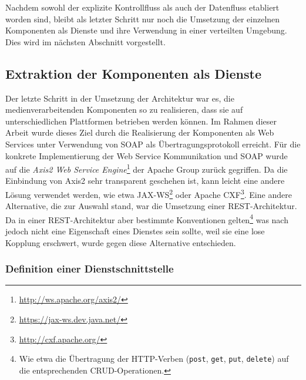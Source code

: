   Nachdem sowohl der explizite Kontrollfluss als auch der Datenfluss etabliert worden sind, bleibt als letzter Schritt nur noch die Umsetzung der einzelnen Komponenten als Dienste und ihre Verwendung in einer verteilten Umgebung. Dies wird im nächsten Abschnitt vorgestellt.
  

\subsection{Extraktion der Komponenten als Dienste} %
\label{sub:extraktion_der_komponenten_als_dienste}

  Der letzte Schritt in der Umsetzung der Architektur war es, die medienverarbeitenden Komponenten so zu realisieren, dass sie auf unterschiedlichen Plattformen betrieben werden können. Im Rahmen dieser Arbeit wurde dieses Ziel durch die Realisierung der Komponenten als Web Services unter Verwendung von SOAP als Übertragungsprotokoll erreicht. Für die konkrete Implementierung der Web Service Kommunikation und SOAP wurde auf die \emph{Axis2 Web Service Engine}\footnote{\url{http://ws.apache.org/axis2/}} der Apache Group zurück gegriffen. Da die Einbindung von Axis2 sehr transparent geschehen ist, kann leicht eine andere Lösung verwendet werden, wie etwa JAX-WS\footnote{\url{https://jax-ws.dev.java.net/}} oder Apache CXF\footnote{\url{http://cxf.apache.org/}}. Eine andere Alternative, die zur Auswahl stand, war die Umsetzung einer REST-Architektur. Da in einer REST-Architektur aber bestimmte Konventionen gelten\footnote{Wie etwa die Übertragung der HTTP-Verben (\lstinline[basicstyle=\ttfamily\footnotesize]{post}, \lstinline[basicstyle=\ttfamily\footnotesize]{get}, \lstinline[basicstyle=\ttfamily\footnotesize]{put}, \lstinline[basicstyle=\ttfamily\footnotesize]{delete}) auf die entsprechenden CRUD-Operationen.} was nach \citep{service_oriented_computing} jedoch nicht eine Eigenschaft eines Dienstes sein sollte, weil sie eine lose Kopplung erschwert, wurde gegen diese Alternative entschieden.
  
\subsubsection{Definition einer Dienstschnittstelle} %
\label{ssub:definition_einer_dienstschnittstelle}

